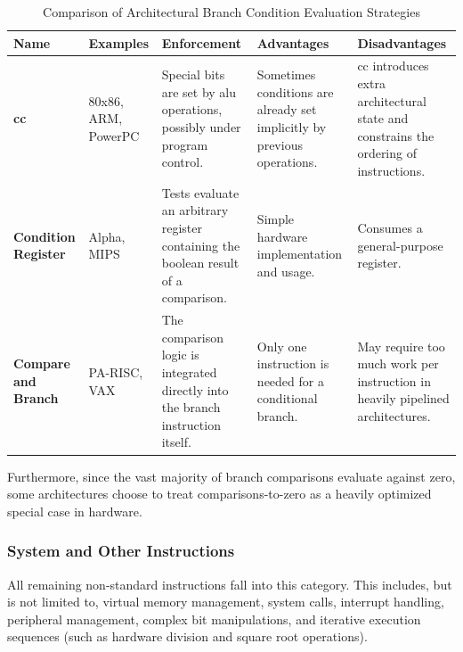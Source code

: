 \begin{table}[!htbp]
    \centering
    \renewcommand{\arraystretch}{1.3} 
    \begin{tabular}{| >{\raggedright\arraybackslash}p{} | >{\raggedright\arraybackslash}p{} | >{\raggedright\arraybackslash}p{} | >{\raggedright\arraybackslash}p{} | >{\raggedright\arraybackslash}p{} |}
         \hline
         \textbf{Name} & \textbf{Examples} & \textbf{Enforcement} & \textbf{Advantages} & \textbf{Disadvantages}\\
         \hline\hline
         \textbf{\gls{cc}} & 80x86, ARM, PowerPC & Special bits are set by \gls{alu} operations, possibly under program control. & Sometimes conditions are already set implicitly by previous operations. & \gls{cc} introduces extra architectural state and constrains the ordering of instructions.\\
         \hline
         \textbf{Condition Register} & Alpha, MIPS & Tests evaluate an arbitrary register containing the boolean result of a comparison. & Simple hardware implementation and usage. & Consumes a general-purpose register.\\
         \hline
         \textbf{Compare and Branch} & PA-RISC, VAX & The comparison logic is integrated directly into the branch instruction itself. & Only one instruction is needed for a conditional branch. & May require too much work per instruction in heavily pipelined architectures. \\
         \hline
    \end{tabular}
    \caption{Comparison of Architectural Branch Condition Evaluation Strategies}
    \label{tab:branch-strategies}
\end{table}

\noindent Furthermore, since the vast majority of branch comparisons evaluate against zero, some architectures choose to treat comparisons-to-zero as a heavily optimized special case in hardware.

\subsubsection{System and Other Instructions}
All remaining non-standard instructions fall into this category. This includes, but is not limited to, virtual memory management, system calls, interrupt handling, peripheral management, complex bit manipulations, and iterative execution sequences (such as hardware division and square root operations).


